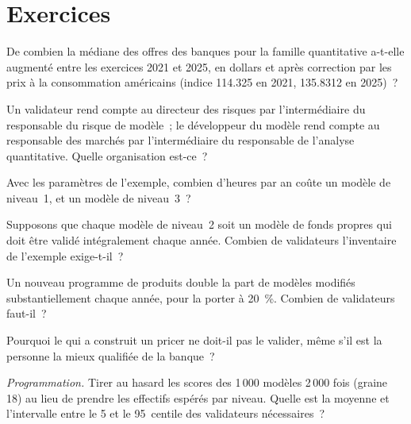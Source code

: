 \section{Exercices}

\begin{exercise}[$\star$]\label{exo:in:bank-quant:1}
De combien la médiane des offres des banques pour la famille quantitative a-t-elle augmenté entre les exercices 2021 et 2025, en dollars et
après correction par les prix à la consommation américains (indice 114.325 en 2021, 135.8312 en 2025)~?
\end{exercise}

\begin{exercise}[$\star$]\label{exo:in:bank-quant:2}
Un validateur rend compte au directeur des risques par l'intermédiaire du responsable du risque de modèle~; le développeur du modèle rend compte au responsable
des marchés par l'intermédiaire du responsable de l'analyse quantitative. Quelle organisation est-ce~?
\end{exercise}

\begin{exercise}[$\star$]\label{exo:in:bank-quant:3}
Avec les paramètres de l'exemple, combien d'heures par an coûte un modèle de niveau~1, et un modèle de niveau~3~?
\end{exercise}

\begin{exercise}[$\star\star$]\label{exo:in:bank-quant:4}
Supposons que chaque modèle de niveau~2 soit un modèle de fonds propres qui doit être validé intégralement chaque année. Combien de validateurs
l'inventaire de l'exemple exige-t-il~?
\end{exercise}

\begin{exercise}[$\star\star$]\label{exo:in:bank-quant:5}
Un nouveau programme de produits double la part de modèles modifiés substantiellement chaque année, pour la porter à 20~\%. Combien de validateurs
faut-il~?
\end{exercise}

\begin{exercise}[$\star\star$]\label{exo:in:bank-quant:6}
Pourquoi le  qui a construit un pricer ne doit-il pas le valider, même s'il est la personne la mieux qualifiée
de la banque~?
\end{exercise}

\begin{exercise}[$\star\star\star$]\label{exo:in:bank-quant:7}
\emph{Programmation.} Tirer au hasard les scores des 1\,000 modèles 2\,000 fois (graine 18) au lieu de prendre les effectifs espérés par niveau.
Quelle est la moyenne et l'intervalle entre le 5 et le 95~centile des validateurs nécessaires~?
\end{exercise}

